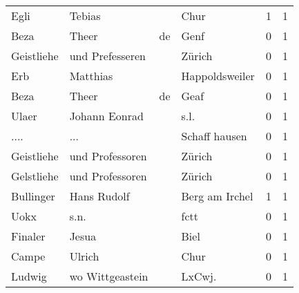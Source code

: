 \documentclass[10pt,a4paper,landscape]{article}
\begin{document}
\begin{longtable}{llllrr}
                     Egli &                             Tebias &             &                                        Chur &          1 &         1 \\
                     Beza &                              Theer &          de &                                        Genf &          0 &         1 \\
               Geistliehe &                    und Prefesseren &             &                                      Zürich &          0 &         1 \\
                      Erb &                           Matthias &             &                              Happoldsweiler &          0 &         1 \\
                     Beza &                              Theer &          de &                                        Geaf &          0 &         1 \\
                    Ulaer &                      Johann Eonrad &             &                                        s.l. &          0 &         1 \\
                     .... &                                ... &             &                               Schaff hausen &          0 &         1 \\
               Geistliehe &                    und Professoren &             &                                      Zürich &          0 &         1 \\
               Gelstliehe &                    und Professoren &             &                                      Zürich &          0 &         1 \\
                Bullinger &                        Hans Rudolf &             &                              Berg am Irchel &          1 &         1 \\
                     Uokx &                               s.n. &             &                                        fctt &          0 &         1 \\
                  Finaler &                              Jesua &             &                                        Biel &          0 &         1 \\
                    Campe &                             Ulrich &             &                                        Chur &          0 &         1 \\
                   Ludwig &                    wo Wittgeastein &             &                                     LxCwj.  &          0 &         1 \\

\end{longtable}
\end{document}
